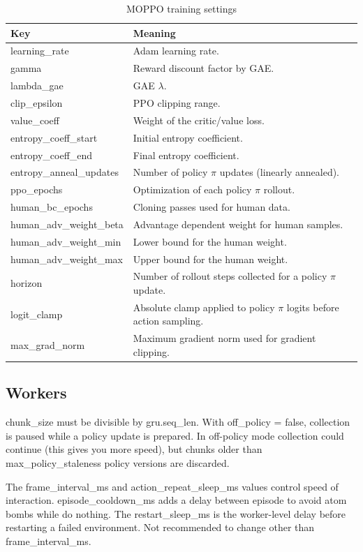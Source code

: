 \begin{table}[ht]
\centering
\small
\begin{tabularx}{\textwidth}{>{\ttfamily}l X}
\hline
\normalfont Key & Meaning \\
\hline
learning\_rate & Adam learning rate. \\
gamma & Reward discount factor by GAE. \\
lambda\_gae & GAE $\lambda$. \\
clip\_epsilon & PPO clipping range. \\
value\_coeff & Weight of the critic/value loss. \\
entropy\_coeff\_start & Initial entropy coefficient. \\
entropy\_coeff\_end & Final entropy coefficient. \\
entropy\_anneal\_updates & Number of policy $\pi$ updates (linearly annealed). \\
ppo\_epochs & Optimization of each policy $\pi$ rollout. \\
human\_bc\_epochs & Cloning passes used for human data. \\
human\_adv\_weight\_beta & Advantage dependent weight for human samples. \\
human\_adv\_weight\_min & Lower bound for the human weight. \\
human\_adv\_weight\_max & Upper bound for the human weight. \\
horizon & Number of rollout steps collected for a policy $\pi$ update. \\
logit\_clamp & Absolute clamp applied to policy $\pi$ logits before action sampling. \\
max\_grad\_norm & Maximum gradient norm used for gradient clipping. \\
\hline
\end{tabularx}
\caption{MOPPO training settings}
\label{tab:training-settings}
\end{table}

\subsection{Workers}

chunk\_size must be divisible by gru.seq\_len. With off\_policy = false, 
collection is paused while a policy update is prepared.  In off-policy mode collection could
continue (this gives you more speed), but chunks older than max\_policy\_staleness policy versions are discarded.

The frame\_interval\_ms and action\_repeat\_sleep\_ms values control speed of interaction.
episode\_cooldown\_ms adds a delay between episode to avoid atom bombs while do nothing. The
restart\_sleep\_ms is the worker-level delay before restarting a
failed environment. Not recommended to change other than frame\_interval\_ms.

